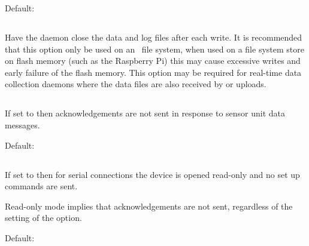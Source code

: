 Default: 

\subsection{}
Have the daemon close the data and log files after each write. It is
recommended that this option only be used on an \nfs\ file system,
when used on a file system store on flash memory (such as the Raspberry
Pi) this may cause excessive writes and early failure of the flash
memory. This option may be required for real-time data collection
daemons where the data files are also received by  or
 uploads.

\subsection{}
If set to  then acknowledgements are not sent in response
to sensor unit data messages.

Default: 

\subsection{}
If set to  then for serial connections the device is opened
read-only and no set up commands are sent.

Read-only mode implies that acknowledgements are not sent, regardless
of the setting of the  option.

Default: 

